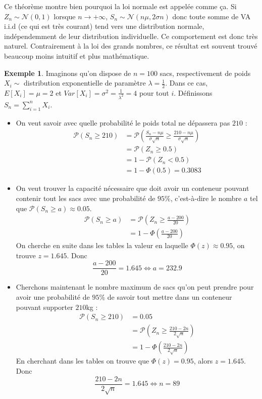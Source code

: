 \documentclass[a4paper,12pt]{report}
\theoremstyle{definition}
\newcommand{\ra}{\rightarrow}
\renewcommand{\(}{\left(}
\renewcommand{\)}{\right)}
\renewcommand{\P}{\mathcal{P}}
\newtheorem{exmp}[thm]{Exemple}
\begin{document}
        Ce théorème montre bien pourquoi la loi normale est appelée comme ça. Si $Z_n\sim\mathcal{N}(0,1)$ lorsque $n\ra+\infty$, $S_n\sim\mathcal{N}(n\mu,2\sigma n)$ donc toute somme de VA i.i.d (ce qui est très courant) tend vers une distribution normale, indépendemment de leur distribution individuelle. Ce comportement est donc très naturel. Contrairement à la loi des grands nombres, ce résultat est souvent trouvé beaucoup moins intuitif et plus mathématique.
        
        \begin{exmp}
            Imaginons qu'on dispose de $n=100$ sacs, respectivement de poids $X_i\sim$ distribution exponentielle de paramètre $\lambda=\frac{1}{2}$. Dans ce cas, $E[X_i] = \mu = 2$ et $Var[X_i] = \sigma^2= \frac{1}{\lambda^2} = 4$ pour tout $i$. Définissons $S_n = \sum_{i=1}^n X_i$.
            \begin{itemize}[label=\textbullet]
                \item On veut savoir avec quelle probabilité le poids total ne dépassera pas $210$ :
                \begin{align*}
                    \P(S_n\geq210) &= \P\left(\frac{S_n-n\mu}{\sigma\sqrt{n}}\geq \frac{210-n\mu}{\sigma\sqrt{n}}\right) \\
                    &= \P(Z_n\geq 0.5) \\
                    &= 1-\P(Z_n<0.5) \\
                    &= 1-\Phi(0.5) = 0.3083
                \end{align*}
                
                \item On veut trouver la capacité nécessaire que doit avoir un conteneur pouvant contenir tout les sacs avec une probabilité de $95\%$, c'est-à-dire le nombre $a$ tel que $\P(S_n\geq a)\approx0.05$.
                \begin{align*}
                    \P(S_n\geq a) &= \P\left(Z_n\geq \frac{a-200}{20}\right) \\
                    &= 1-\Phi \left(\frac{a-200}{20}\right)
                \end{align*}
                On cherche en suite dans les tables la valeur en laquelle $\Phi(z)\approx0.95$, on trouve $z = 1.645$. Donc
                $$\frac{a-200}{20} = 1.645 \Leftrightarrow a=232.9$$
                
                \item Cherchons maintenant le nombre maximum de sacs qu'on peut prendre pour avoir une probabilité de $95\%$ de savoir tout mettre dans un conteneur pouvant supporter $210$kg :
                \begin{align*}
                    \P(S_n\geq 210) &= 0.05 \\
                    &= \P\left( Z_n \geq \frac{210-2n}{2\sqrt{n}}\right) \\
                    &= 1-\Phi\left(\frac{210-2n}{2\sqrt{n}}\right) 
                \end{align*}
                En cherchant dans les tables on trouve que $\Phi(z) = 0.95$, alors $z = 1.645$. Donc
                $$\frac{210-2n}{2\sqrt{n}}=1.645\Leftrightarrow n = 89$$
                

\end{itemize}
\end{exmp}
\end{document}
